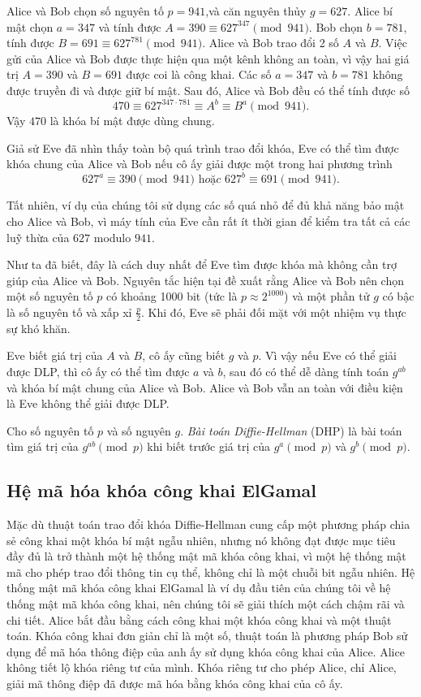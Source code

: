 \begin{example}
	Alice và Bob chọn số nguyên tố $p = 941$,và căn nguyên thủy $g = 627$.
	Alice bí mật chọn $a= 347$ và tính được $A = 390 \equiv 627^{347} \pmod{941}$. Bob chọn $b= 781$, tính được $B = 691 \equiv 627^{781} \pmod{941}$. Alice và Bob trao đổi 2 số $A$ và $B$. Việc gửi của Alice và Bob được
	thực hiện qua một kênh không an toàn, vì vậy hai giá trị $A = 390$ và $B = 691$
	được coi là công khai. Các số $a = 347$ và $b = 781$ không được
	truyền đi và được giữ bí mật. Sau đó, Alice và Bob đều có thể tính được số
	$$ 470 \equiv 627 ^{347 \cdot 781} \equiv A^b \equiv B^a \pmod{941}.$$
	Vậy $470$ là khóa bí mật được dùng chung.
\end{example}
Giả sử Eve đã nhìn thấy toàn bộ quá trình trao đổi khóa, Eve có thể tìm được khóa chung của Alice và Bob nếu cô ấy giải được một trong hai phương trình
$$627^a \equiv 390 \pmod{941} \textit{ hoặc } 627^b \equiv 691 \pmod{941}.$$


Tất nhiên, ví dụ của chúng tôi sử dụng các số quá nhỏ để đủ khả năng bảo
mật cho Alice và Bob, vì máy tính của Eve cần rất ít thời gian để kiểm
tra tất cả các luỹ thừa của $627$ modulo $941$.

Như ta đã biết, đây là cách duy nhất để Eve tìm được khóa mà không cần trợ giúp của Alice và Bob. Nguyên tắc hiện tại đề xuất rằng
Alice và Bob nên chọn một số nguyên tố $p$ có khoảng 1000 bit (tức là $p \approx 2^{1000}$) và
một phần tử $g$ có bậc là số nguyên tố và xấp xỉ $\frac{p}{2}$. Khi đó, Eve sẽ phải đối mặt với một nhiệm vụ thực sự khó khăn.

Eve biết giá trị của $A$ và $B$, cô ấy cũng biết $g$ và $p$.
Vì vậy nếu Eve có thể giải được DLP, thì cô ấy
có thể tìm được $a$ và $b$, sau đó có thể dễ dàng tính toán $g^{ab}$ và khóa bí mật
chung của Alice và Bob. Alice và Bob vẫn an toàn với điều kiện là Eve
không thể giải được DLP.

\begin{definition}
	Cho số nguyên tố $p$ và số nguyên $g$. \textit{Bài toán Diffie-Hellman} (DHP) là bài toán tìm giá trị của $g^{ab} \pmod{p}$ khi biết trước giá trị của $g^a \pmod{p}$ và $g^b \pmod{p}$.
\end{definition}

\subsection{Hệ mã hóa khóa công khai ElGamal}
Mặc dù thuật toán trao đổi khóa Diffie-Hellman cung cấp một phương pháp
chia sẻ công khai một khóa bí mật ngẫu nhiên, nhưng nó không đạt được mục
tiêu đầy đủ là trở thành một hệ thống mật mã khóa công khai, vì một hệ thống
mật mã cho phép trao đổi thông tin cụ thể, không chỉ là một chuỗi bit ngẫu
nhiên.
Hệ thống mật mã khóa công khai ElGamal là ví dụ đầu tiên của chúng tôi về
hệ thống mật mã khóa công khai, nên chúng tôi sẽ giải thích một cách chậm rãi và chi tiết. Alice bắt đầu bằng cách công khai một khóa công khai và một thuật toán. Khóa công khai đơn giản chỉ là một số, thuật toán là phương pháp Bob sử dụng để mã hóa thông điệp của anh ấy sử dụng khóa công khai của Alice.
Alice không tiết lộ khóa riêng tư của mình. Khóa riêng tư cho phép Alice, chỉ Alice, giải mã thông điệp đã được mã hóa bằng khóa công khai của cô ấy.


